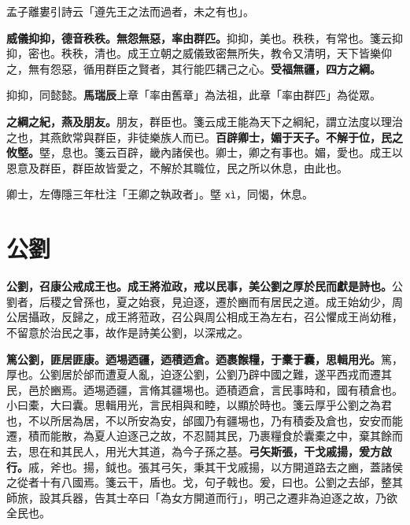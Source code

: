 \begin{quoting}孟子離婁引詩云「遵先王之法而過者，未之有也」。\end{quoting}

\textbf{威儀抑抑，德音秩秩。無怨無惡，率由群匹。}{\footnotesize 抑抑，美也。秩秩，有常也。箋云抑抑，密也。秩秩，清也。成王立朝之威儀致密無所失，教令又清明，天下皆樂仰之，無有怨惡，循用群臣之賢者，其行能匹耦己之心。}\textbf{受福無疆，四方之綱。}

\begin{quoting}抑抑，同懿懿。\textbf{馬瑞辰}上章「率由舊章」為法祖，此章「率由群匹」為從眾。\end{quoting}

\textbf{之綱之紀，燕及朋友。}{\footnotesize 朋友，群臣也。箋云成王能為天下之綱紀，謂立法度以理治之也，其燕飲常與群臣，非徒樂族人而已。}\textbf{百辟卿士，媚于天子。不解于位，民之攸墍。}{\footnotesize 墍，息也。箋云百辟，畿內諸侯也。卿士，卿之有事也。媚，愛也。成王以恩意及群臣，群臣故皆愛之，不解於其職位，民之所以休息，由此也。}

\begin{quoting}卿士，左傳隱三年杜注「王卿之執政者」。墍 \texttt{xì}，同愒，休息。\end{quoting}

\section{公劉}


\textbf{公劉，召康公戒成王也。成王將涖政，戒以民事，美公劉之厚於民而獻是詩也。}{\footnotesize 公劉者，后稷之曾孫也，夏之始衰，見迫逐，遷於豳而有居民之道。成王始幼少，周公居攝政，反歸之，成王將蒞政，召公與周公相成王為左右，召公懼成王尚幼稚，不留意於治民之事，故作是詩美公劉，以深戒之。}

\textbf{篤公劉，匪居匪康。迺埸迺疆，迺積迺倉。迺裹餱糧，于橐于囊，思輯用光。}{\footnotesize 篤，厚也。公劉居於邰而遭夏人亂，迫逐公劉，公劉乃辟中國之難，遂平西戎而遷其民，邑於豳焉。迺埸迺疆，言脩其疆埸也。迺積迺倉，言民事時和，國有積倉也。小曰橐，大曰囊。思輯用光，言民相與和睦，以顯於時也。箋云厚乎公劉之為君也，不以所居為居，不以所安為安，邰國乃有疆埸也，乃有積委及倉也，安安而能遷，積而能散，為夏人迫逐己之故，不忍鬪其民，乃裹糧食於囊橐之中，棄其餘而去，思在和其民人，用光大其道，為今子孫之基。}\textbf{弓矢斯張，干戈戚揚，爰方啟行。}{\footnotesize 戚，斧也。揚，鉞也。張其弓矢，秉其干戈戚揚，以方開道路去之豳，蓋諸侯之從者十有八國焉。箋云干，盾也。戈，句孑戟也。爰，曰也。公劉之去邰，整其師旅，設其兵器，告其士卒曰「為女方開道而行」，明己之遷非為迫逐之故，乃欲全民也。}

